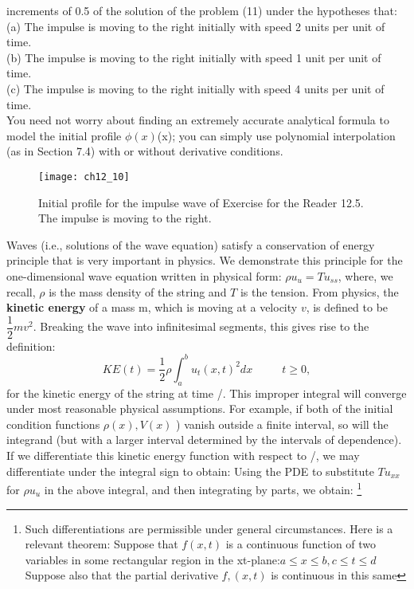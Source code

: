 \documentclass[../main.tex]{subfiles}
\begin{document}
{{increments of 0.5 of the solution of the problem (11) under the hypotheses that:  
\\
(a) The impulse is moving to the right initially with speed 2 units per unit of time.
\\ 
(b) The impulse is moving to the right initially with speed 1 unit per unit of time.
\\ 
(c) The impulse is moving to the right initially with speed 4 units per unit of time.
\\
You need not worry about finding an extremely accurate analytical formula to 
model the initial profile  $\phi(x)$(x); you can simply use polynomial interpolation (as in 
Section 7.4) with or without derivative conditions. 
\begin{figure}[H]
	\centering
	\texttt{[image: ch12\_10]}
	\caption{\textsf{Initial profile for the impulse wave of Exercise for the Reader 12.5. The 
impulse is moving to the right. }}
	\label{pfig:ch12_10}
\end{figure}
Waves (i.e., solutions of the wave equation) satisfy a conservation of energy 
principle that is very important in physics. We demonstrate this principle for the 
one-dimensional wave equation written in physical form: $\rho u_u = Tu_{ss}$, where, we recall, $ \rho $ is the mass density of the string and $T$ is the tension. From physics, the 
\textbf{kinetic energy} of a mass m, which is moving at a velocity $v$, is defined to be $\dfrac{1}{2}mv^2$. Breaking the wave into infinitesimal segments, this gives rise to the 
definition: 
\begin{equation}
KE(t)=\dfrac{1}{2} \rho \int_a^b u_t (x,t)^2 dx ~~~~~~~~~~~~ t\geq 0, 
\end{equation}
for the kinetic energy of the string at time /. This improper integral will converge 
under most reasonable physical assumptions. For example, if both of the initial 
condition functions  $ \rho (x), V(x)$ ) vanish outside a finite interval, so will the 
integrand (but with a larger interval determined by the intervals of dependence). If we differentiate this kinetic energy function with respect to /, we may differentiate 
under the integral sign to obtain: 
Using the PDE to substitute $ Tu_{xx}$for $\rho u_u$ in the above integral, and then 
integrating by parts, we obtain: 
\footnote{ Such differentiations are permissible under general circumstances. Here is a relevant theorem: 
Suppose that $f(x,t)$ is a continuous function of two variables in some rectangular region in the xt-plane:$a\leqslant x\leqslant b, c\leqslant t \leqslant d$ Suppose also that the partial derivative $f,(x,t)$ is continuous in this same 
}}}
\end{document}
